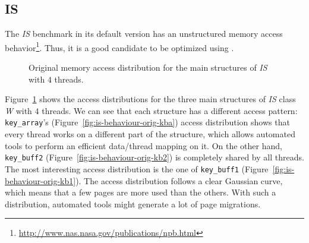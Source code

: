 \subsection{IS}
\label{sec:exp-is}

The \emph{IS} benchmark in its default version has an unstructured memory access behavior\footnote{\url{http://www.nas.nasa.gov/publications/npb.html}}. Thus, it is a good candidate to be optimized using \TABARNAC.
\begin{figure}[!p]
    \centering

    \vspace{-1mm}
    \vspace{-1mm}
    \caption{Original memory access distribution for the main structures of
        \emph{IS} with $4$ threads.}
    \label{fig:is-behaviour-orig}
\end{figure}



Figure~\ref{fig:is-behaviour-orig} shows the access distributions for the
three main structures of \emph{IS} class \emph{W} with $4$ threads. We can see that
each structure has a different access pattern: \texttt{key\_array}'s
(Figure~\ref{fig:is-behaviour-orig-kba}) access distribution shows that every
thread works on a different part of the structure, which allows automated
tools to perform an efficient data/thread mapping on it. On the other hand, \texttt{key\_buff2}
(Figure~\ref{fig:is-behaviour-orig-kb2}) is completely shared by all threads.
The most interesting access distribution is the one of \texttt{key\_buff1}
(Figure~\ref{fig:is-behaviour-orig-kb1}). The access distribution follows a clear Gaussian curve, which means that a few pages are more used than the
others. With such a distribution, automated tools might generate a lot of page
migrations.



